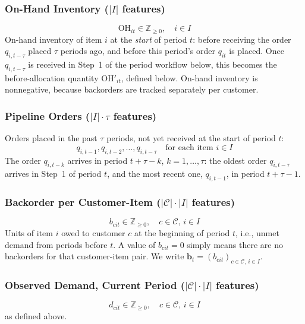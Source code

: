 \documentclass[11pt, a4paper]{article}
\theoremstyle{definition}
\theoremstyle{remark}
\newcommand{\OH}{\text{OH}}
\begin{document}
\subsubsection{On-Hand Inventory ($|I|$ features)}
\begin{equation}
    \OH_{it} \in \mathbb{Z}_{\geq 0}, \quad i \in I
\end{equation}
On-hand inventory of item $i$ at the \emph{start} of period $t$: before receiving the order $q_{i,t-\tau}$ placed $\tau$ periods ago, and before this period's order $q_{it}$ is placed. Once $q_{i,t-\tau}$ is received in Step~1 of the period workflow below, this becomes the before-allocation quantity $\OH'_{it}$, defined below. On-hand inventory is nonnegative, because backorders are tracked separately per customer.

\subsubsection{Pipeline Orders ($|I| \cdot \tau$ features)}
Orders placed in the past $\tau$ periods, not yet received at the start of period $t$:
\begin{equation}
    q_{i,t-1}, q_{i,t-2}, \ldots, q_{i,t-\tau} \quad \text{for each item } i \in I
\end{equation}
The order $q_{i,t-k}$ arrives in period $t+\tau-k$, $k = 1, \ldots, \tau$: the oldest order $q_{i,t-\tau}$ arrives in Step~1 of period $t$, and the most recent one, $q_{i,t-1}$, in period $t+\tau-1$.

\subsubsection{Backorder per Customer-Item ($|\mathcal{C}| \cdot |I|$ features)}
\begin{equation}
    b_{cit} \in \mathbb{Z}_{\geq 0}, \quad c \in \mathcal{C}, \, i \in I
\end{equation}
Units of item $i$ owed to customer $c$ at the beginning of period $t$, i.e., unmet demand from periods before $t$. A value of $b_{cit} = 0$ simply means there are no backorders for that customer-item pair. We write $\mathbf{b}_t = (b_{cit})_{c \in \mathcal{C},\, i \in I}$.

\subsubsection{Observed Demand, Current Period ($|\mathcal{C}| \cdot |I|$ features)}
\begin{equation}
    d_{cit} \in \mathbb{Z}_{\geq 0}, \quad c \in \mathcal{C}, \, i \in I
\end{equation}
as defined above.
\end{document}
